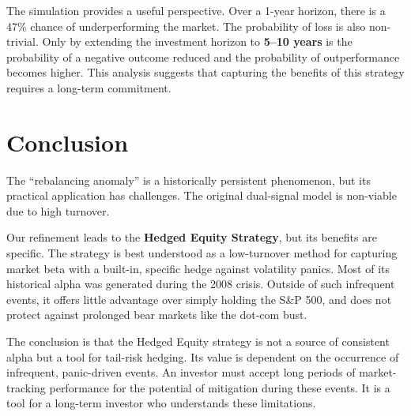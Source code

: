 \documentclass{article}
\begin{document}
The simulation provides a useful perspective. Over a 1-year horizon, there is a 47\% chance of underperforming the market. The probability of loss is also non-trivial. Only by extending the investment horizon to \textbf{5--10 years} is the probability of a negative outcome reduced and the probability of outperformance becomes higher. This analysis suggests that capturing the benefits of this strategy requires a long-term commitment.

\vspace{1em}
\hrulefill

\section{Conclusion}
The ``rebalancing anomaly'' is a historically persistent phenomenon, but its practical application has challenges. The original dual-signal model is non-viable due to high turnover.

Our refinement leads to the \textbf{Hedged Equity Strategy}, but its benefits are specific. The strategy is best understood as a low-turnover method for capturing market beta with a built-in, specific hedge against volatility panics. Most of its historical alpha was generated during the 2008 crisis. Outside of such infrequent events, it offers little advantage over simply holding the S\&P 500, and does not protect against prolonged bear markets like the dot-com bust.

The conclusion is that the Hedged Equity strategy is not a source of consistent alpha but a tool for tail-risk hedging. Its value is dependent on the occurrence of infrequent, panic-driven events. An investor must accept long periods of market-tracking performance for the potential of mitigation during these events. It is a tool for a long-term investor who understands these limitations.
\end{document}

